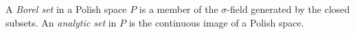 A \emph{Borel set} in a Polish space $P$ is a member of the $\sigma$-field generated by the closed subsets. An \emph{analytic set} in $P$ is the continuous image of a Polish space.
